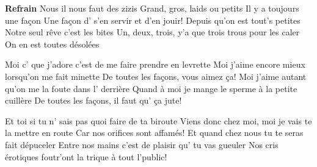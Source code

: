 \footnotemark [
ititle={Zizis, les},
tu={La chanson de Paris}]


\beginchorus
\textbf{Refrain}
Nous il nous faut des zizis
Grand, gros, laids ou petits
Il y a toujours une façon
Une façon d' s'en servir et d'en jouir!
Depuis qu'on est tout's petites
Notre seul rêve c'est les bites
Un, deux, trois, y'a que trois trous pour les caler
On en est toutes désolées
\endchorus

\beginverse
Moi c' que j'adore c'est de me faire prendre en levrette
Moi j'aime encore mieux lorsqu'on me fait minette
De toutes les façons, vous aimez ça!
Moi j'aime autant qu'on me la foute dans l' derrière
Quand à moi je mange le sperme à la petite cuillère
De toutes les façons, il faut qu' ça jute!
\endverse

\beginverse
Et toi si tu n' sais pas quoi faire de ta biroute
Viens donc chez moi, moi je vais te la mettre en route
Car nos orifices sont affamés!
Et quand chez nous tu te seras fait dépuceler
Entre nos mains c'est de plaisir qu' tu vas gueuler
Nos cris érotiques foutr'ont la trique à tout l'public!
\endverse
\endsong